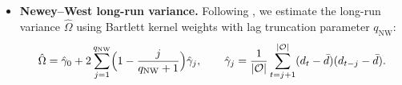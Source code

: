 \begin{itemize}
\item \textbf{Newey--West long-run variance.} Following \citet{NeweyWest1987}, we estimate the long-run variance $\hat\Omega$ using Bartlett kernel weights with lag truncation parameter $q_{\mathrm{NW}}$:
  \[
    \hat\Omega = \hat\gamma_0 + 2 \sum_{j=1}^{q_{\mathrm{NW}}} \Bigl(1 - \frac{j}{q_{\mathrm{NW}} + 1}\Bigr) \hat\gamma_j,
    \qquad
    \hat\gamma_j = \frac{1}{|\mathcal O|} \sum_{t=j+1}^{|\mathcal O|} (d_t - \bar d)(d_{t-j} - \bar d).
  \]

\end{itemize}
